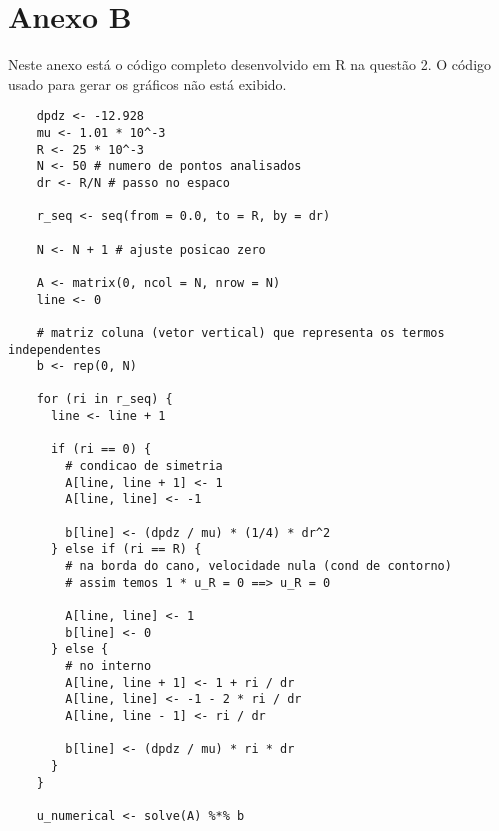 \section*{Anexo B}

Neste anexo está o código completo desenvolvido em R na questão 2. O código usado para gerar os gráficos não está exibido.

\begin{lstlisting}
    dpdz <- -12.928
    mu <- 1.01 * 10^-3
    R <- 25 * 10^-3
    N <- 50 # numero de pontos analisados 
    dr <- R/N # passo no espaco

    r_seq <- seq(from = 0.0, to = R, by = dr)

    N <- N + 1 # ajuste posicao zero

    A <- matrix(0, ncol = N, nrow = N)
    line <- 0
    
    # matriz coluna (vetor vertical) que representa os termos independentes
    b <- rep(0, N)
    
    for (ri in r_seq) {
      line <- line + 1
      
      if (ri == 0) {
        # condicao de simetria
        A[line, line + 1] <- 1
        A[line, line] <- -1
        
        b[line] <- (dpdz / mu) * (1/4) * dr^2
      } else if (ri == R) {
        # na borda do cano, velocidade nula (cond de contorno)
        # assim temos 1 * u_R = 0 ==> u_R = 0
        
        A[line, line] <- 1
        b[line] <- 0
      } else {
        # no interno
        A[line, line + 1] <- 1 + ri / dr
        A[line, line] <- -1 - 2 * ri / dr
        A[line, line - 1] <- ri / dr
        
        b[line] <- (dpdz / mu) * ri * dr
      }
    }
    
    u_numerical <- solve(A) %*% b
\end{lstlisting}